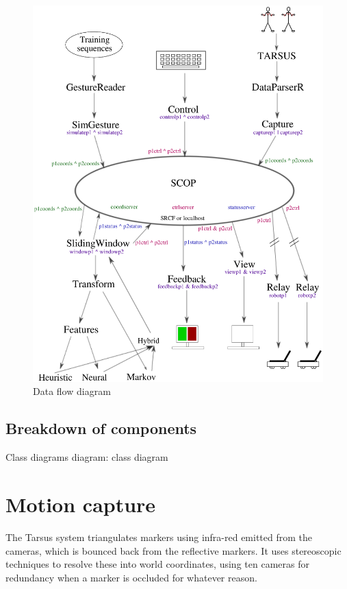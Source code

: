 \documentclass[12pt,a4,notitlepage]{report}
\renewcommand{\_}{\texttt{\symbol{95}}}
\newcommand{\<}{\texttt{\symbol{60}}}
\renewcommand{\>}{\texttt{\symbol{62}}}
\begin{document}
\begin{figure}
\centering
\includegraphics[scale=0.75,angle=0]{diagrams/dataflowdiagram.ps}
\caption{Data flow diagram}
\label{dfd}
\end{figure}

\subsection{Breakdown of components}

Class diagrams
{diagram: class diagram}

\section{Motion capture}

The Tarsus system triangulates markers using infra-red emitted from the cameras, which is bounced back from the reflective markers. It uses stereoscopic techniques to resolve these into world coordinates, using ten cameras for redundancy when a marker is occluded for whatever reason.
\end{document}
